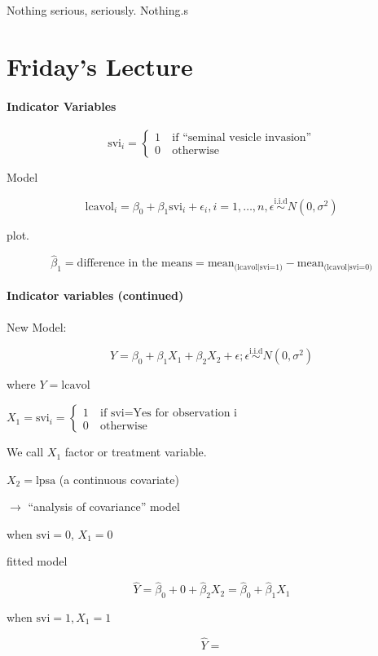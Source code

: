 \documentclass[a4paper, 11pt, twoside]{article}
\begin{document}
Nothing serious, seriously. Nothing.s

\section{Friday's Lecture}
\paragraph{Indicator Variables}
\[\text{svi}_i=\begin{cases}1\ &\text{if ``seminal vesicle invasion''}\\ 0\ &\text{otherwise}\end{cases}\]

Model

\[\text{lcavol}_i = \beta_0 + \beta_1\text{svi}_i + \epsilon_i, i=1,\dots, n, \epsilon \overset{\text{i.i.d}}\sim N(0, \sigma^2)\]

plot.

\[\hat{\beta}_1 = \text{difference in the means} = \text{mean}_{\text{(lcavol|svi=1)}} - \text{mean}_{\text{(lcavol|svi=0)}}\]

\paragraph{Indicator variables (continued)}

New Model:

\[Y=\beta_0+\beta_1X_1+\beta_2X_2+\epsilon; \epsilon \overset{\text{i.i.d}}\sim N(0, \sigma^2)\]

where $Y=\text{lcavol}$

$X_1=\text{svi}_i=\begin{cases} 1\ &\text{if svi=Yes for observation i}\\ 0\ &\text{otherwise}\end{cases}$

We call $X_1$ factor or treatment variable.

$X_2=\text{lpsa}$ (a continuous covariate)

$\rightarrow$ ``analysis of covariance'' model

when $\text{svi}=0$, $X_1=0$

fitted model

\[\hat{Y}=\hat{\beta}_0+0+\hat{\beta}_2X_2=\hat{\beta}_0 + \hat{\beta}_1X_1\]

when $\text{svi}=1, X_1=1$

\[\hat{Y}=\]
\end{document}
